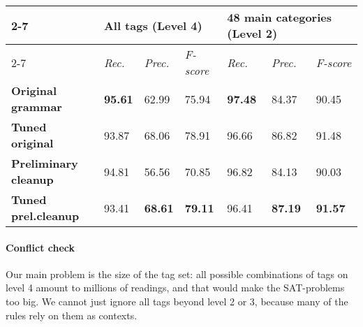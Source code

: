 {{\begin{table*}[t]
\centering
\begin{tabular}{l|l|l|l|l|l|l|}
\cline{2-7}
                                                 & \multicolumn{3}{l|}{\textbf{All tags} (Level 4)}            & \multicolumn{3}{l|}{\textbf{48 main categories} (Level 2)}  \\ \cline{2-7} 
                                                 & \textit{Rec.} & \textit{Prec.} & \textit{F-score} & \textit{Rec.} & \textit{Prec.} & \textit{F-score} \\ \hline
\multicolumn{1}{|l|}{\textbf{Original grammar}}     
					    & \textbf{95.61}  & 62.99         &  75.94         & \textbf{97.48}  &  84.37           &  90.45           \\ \hline
\multicolumn{1}{|l|}{\textbf{Tuned original}}    
					    & 93.87          & 68.06             &  78.91              & 96.66          &  86.82           &  91.48            \\ \hline
\multicolumn{1}{|l|}{\textbf{Preliminary cleanup}}  
					   & 94.81           & 56.56             & 70.85               &  96.82         &  84.13           &  90.03           \\ \hline
\multicolumn{1}{|l|}{\textbf{Tuned prel.cleanup}}      
					   & 93.41           & \textbf{68.61}  & \textbf{79.11}   &  96.41        &  \textbf{87.19}   &  \textbf{91.57}           \\ \hline
\end{tabular}
\caption{Preliminary evaluation on words, excluding punctuation, for levels 4 and 2 of granularity.}
\label{table:res}
\end{table*}

\paragraph{Conflict check}


Our main problem is the size of the tag set: all possible combinations of tags on level 4 amount to millions of readings,
and that would make the SAT-problems too big.
We cannot just ignore all tags beyond level 2 or 3, because many of the rules rely on them as contexts.

}}
